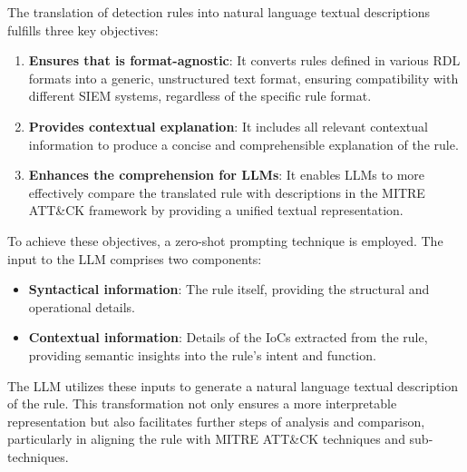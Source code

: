 The translation of detection rules into natural language textual descriptions fulfills three key objectives:
\begin{enumerate}[nosep,leftmargin=*]
    \item \textbf{Ensures that \methodName is format-agnostic}: It converts rules defined in various RDL formats into a generic, unstructured text format, ensuring compatibility with different SIEM systems, regardless of the specific rule format.
    \item \textbf{Provides contextual explanation}: It includes all relevant contextual information to produce a concise and comprehensible explanation of the rule.
    \item \textbf{Enhances the comprehension for LLMs}: It enables LLMs to more effectively compare the translated rule with descriptions in the MITRE ATT\&CK framework by providing a unified textual representation.
\end{enumerate}
To achieve these objectives, a zero-shot prompting technique is employed. 
The input to the LLM comprises two components:
\begin{itemize}
    \item \textbf{Syntactical information}: The rule itself, providing the structural and operational details.
    \item \textbf{Contextual information}: Details of the IoCs extracted from the rule, providing semantic insights into the rule's intent and function.
\end{itemize}
The LLM utilizes these inputs to generate a natural language textual description of the rule. 
This transformation not only ensures a more interpretable representation but also facilitates further steps of analysis and comparison, particularly in aligning the rule with MITRE ATT\&CK techniques and sub-techniques.



